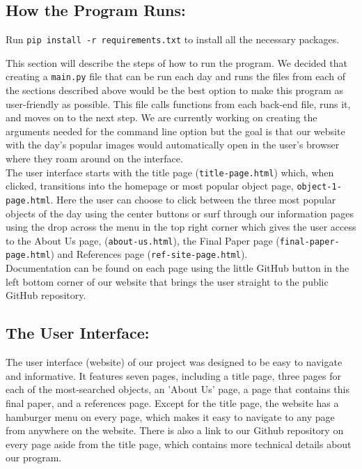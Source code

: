\documentclass[12pt,letterpaper]{article}
\begin{document}
\subsection*{How the Program Runs:}

\begin{center} 
Run \texttt{pip install -r requirements.txt} to install all the necessary packages.\\
\end{center}


\quad This section will describe the steps of how to run the program. We  decided that 
creating a \texttt{main.py} file that can be run each day and runs the files from 
each of the sections described above would be the best option to make this program 
as user-friendly as possible. This file calls functions from each back-end file, 
runs it, and moves on to the next step. We are currently working on creating the 
arguments needed for the command line option but the goal is that our website with 
the day's popular images would automatically open in the user's browser where they 
roam around on the interface.\\

\quad The user interface starts with the title page (\texttt{title-page.html}) which, when 
clicked, transitions into the homepage or most popular object page,
\texttt{object-1-page.html}. Here the user can choose to click between the three most 
popular objects of the day using the center buttons or surf through our information 
pages using the drop across the menu in the top right corner which gives the user access 
to the About Us page, (\texttt{about-us.html}), the Final Paper page
 (\texttt{final-paper-page.html}) and References page (\texttt{ref-site-page.html}). \\

\quad Documentation can be found on each page using the little GitHub button in the left 
bottom corner of our website that brings the user straight to the public GitHub repository. \\



\subsection*{The User Interface:}
\quad The user interface (website) of our project was designed to be easy to navigate 
and informative. It features seven pages, including a title page, three pages for each 
of the most-searched objects, an 'About Us' page, a page that contains this final paper, 
and a references page. Except for the title page, the website has a hamburger menu on 
every page, which makes it easy to navigate to any page from anywhere on the website. 
There is also a link to our Github repository on every page aside from the title page, 
which contains more technical details about our program. \\
\end{document}

